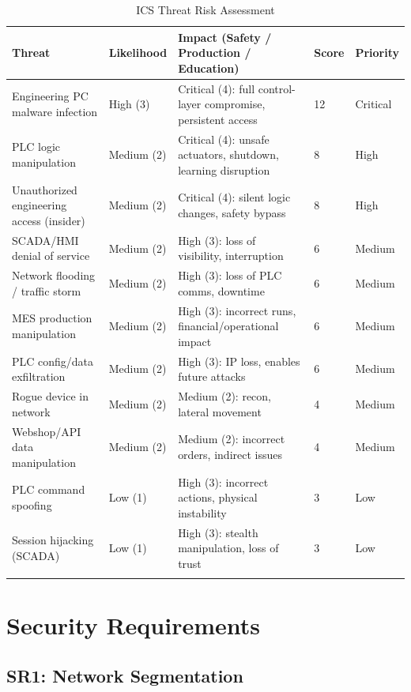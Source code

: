 \documentclass{report}
\begin{document}
{\small
\setlength{\tabcolsep}{4pt}
\begin{longtable}{L{4.0cm} L{1.8cm} L{6.0cm} L{1.4cm} L{1.6cm}}
\toprule
\textbf{Threat} & \textbf{Likelihood} & \textbf{Impact (Safety / Production / Education)} & \textbf{Score} & \textbf{Priority} \\
\midrule \endhead
Engineering PC malware infection & High (3) & Critical (4): full control-layer compromise, persistent access & 12 & Critical \\
PLC logic manipulation & Medium (2) & Critical (4): unsafe actuators, shutdown, learning disruption & 8 & High \\
Unauthorized engineering access (insider) & Medium (2) & Critical (4): silent logic changes, safety bypass & 8 & High \\
SCADA/HMI denial of service & Medium (2) & High (3): loss of visibility, interruption & 6 & Medium \\
Network flooding / traffic storm & Medium (2) & High (3): loss of PLC comms, downtime & 6 & Medium \\
MES production manipulation & Medium (2) & High (3): incorrect runs, financial/operational impact & 6 & Medium \\
PLC config/data exfiltration & Medium (2) & High (3): IP loss, enables future attacks & 6 & Medium \\
Rogue device in network & Medium (2) & Medium (2): recon, lateral movement & 4 & Medium \\
Webshop/API data manipulation & Medium (2) & Medium (2): incorrect orders, indirect issues & 4 & Medium \\
PLC command spoofing & Low (1) & High (3): incorrect actions, physical instability & 3 & Low \\
Session hijacking (SCADA) & Low (1) & High (3): stealth manipulation, loss of trust & 3 & Low \\
\bottomrule
\caption{ICS Threat Risk Assessment}
\end{longtable}
}

\chapter{Security Requirements}\label{chap:5-secreq}

\section{SR1: Network Segmentation}\label{SR1:networkseg}
\end{document}
